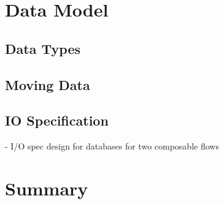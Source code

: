 \newpage



\section{Data Model}

\subsection{Data Types}


\subsection{Moving Data}

\subsection{IO Specification}
- I/O spec design for databases for two composable flows


\section{Summary}



